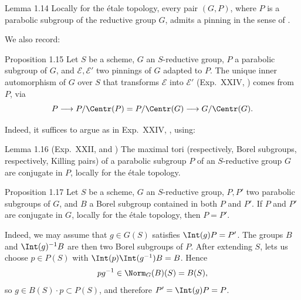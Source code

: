 \begin{sgastatement}{Lemma 1.14}
Locally for the étale topology, every pair \((G,P)\), where \(P\) is a
parabolic subgroup of the reductive group \(G\), admits a pinning in the
sense of .
\end{sgastatement}

We also record:

\begin{sgastatement}{Proposition 1.15}
Let \(S\) be a scheme, \(G\) an \(S\)-reductive group, \(P\) a parabolic
subgroup of \(G\), and \(\mathcal E,\mathcal E'\) two pinnings of \(G\)
adapted to \(P\).  The unique inner automorphism of \(G\) over \(S\) that
transforms \(\mathcal E\) into \(\mathcal E'\) \textup{(Exp.\ XXIV, )}
comes from \(P\), via
\[
 P\longrightarrow P/\Centr(P)
 =P/\Centr(G)\longrightarrow G/\Centr(G).
\]
\end{sgastatement}

Indeed, it suffices to argue as in Exp.\ XXIV, , using:

\begin{sgastatement}{Lemma 1.16 \textup{(Exp.\ XXII,  and )}}
The maximal tori \textup{(respectively, Borel subgroups, respectively,
Killing pairs)} of a parabolic subgroup \(P\) of an \(S\)-reductive group
\(G\) are conjugate in \(P\), locally for the étale topology.
\end{sgastatement}

\begin{sgastatement}{Proposition 1.17}
Let \(S\) be a scheme, \(G\) an \(S\)-reductive group, \(P,P'\) two
parabolic subgroups of \(G\), and \(B\) a Borel subgroup contained in both
\(P\) and \(P'\).  If \(P\) and \(P'\) are conjugate in \(G\), locally for
the étale topology, then \(P=P'\).
\end{sgastatement}

Indeed, we may assume that \(g\in G(S)\) satisfies \(\Int(g)P=P'\).  The
groups \(B\) and \(\Int(g)^{-1}B\) are then two Borel subgroups of \(P\).
After extending \(S\),  lets us choose \(p\in P(S)\) with
\(\Int(p)\Int(g^{-1})B=B\).  Hence
\[
 pg^{-1}\in\Norm_G(B)(S)=B(S),
\]
so \(g\in B(S)\cdot p\subset P(S)\), and therefore
\(P'=\Int(g)P=P\).

